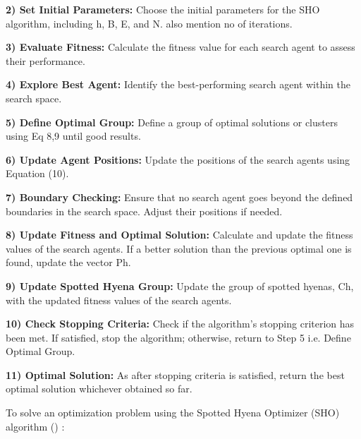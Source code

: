 \documentclass[12pt]{article}
\begin{document}
\textbf{2) Set Initial Parameters:} Choose the initial parameters for the SHO algorithm, including h, B, E, and N. also mention no of iterations.

\textbf{3) Evaluate Fitness:} Calculate the fitness value for each search agent to assess their performance.

\textbf{4) Explore Best Agent:} Identify the best-performing search agent within the search space.

\textbf{5) Define Optimal Group:} Define a group of optimal solutions or clusters using Eq 8,9  until good results.

\textbf{6) Update Agent Positions:} Update the positions of the search agents using Equation (10).

\textbf{7) Boundary Checking:} Ensure that no search agent goes beyond the defined boundaries in the search space. Adjust their positions if needed.

\textbf{8) Update Fitness and Optimal Solution:} Calculate and update the fitness values of the search agents. If a better solution than the previous optimal one is found, update the vector Ph.

\textbf{9) Update Spotted Hyena Group:} Update the group of spotted hyenas, Ch, with the updated fitness values of the search agents.

\textbf{10) Check Stopping Criteria: }Check if the algorithm's stopping criterion has been met. If satisfied, stop the algorithm; otherwise, return to Step 5 i.e. Define Optimal Group.

\textbf{11) Optimal Solution: } As after stopping criteria is satisfied, return the best optimal solution whichever obtained so far.


To solve an optimization problem using the Spotted Hyena Optimizer (SHO) algorithm (\cite{dhiman2017spotted}) :
\end{document}

